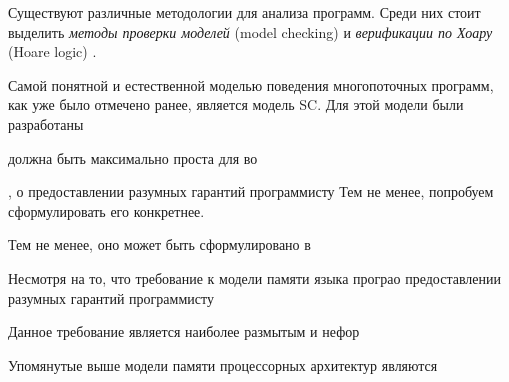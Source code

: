 Существуют различные методологии для анализа программ.
Среди них стоит выделить \emph{методы проверки моделей} (model checking) \cite{Peled-al:BOOK08,Clarke-al:BOOK99}
и \emph{верификации по Хоару} (Hoare logic) \cite{Hoare:CACM69}.

Самой понятной и естественной моделью поведения многопоточных программ, как уже было отмечено ранее,
является модель SC.
Для этой модели были разработаны 


должна быть максимально проста для во

, о предоставлении разумных
гарантий программисту
Тем не менее, попробуем сформулировать его конкретнее.


Тем не менее, оно может быть сформулировано в 

Несмотря на то, что требование к модели памяти языка програо предоставлении разумных гарантий программисту 

Данное требование является наиболее размытым и нефор





Упомянутые выше модели памяти процессорных архитектур являются 


\cite{Batty-al:ESOP15}

